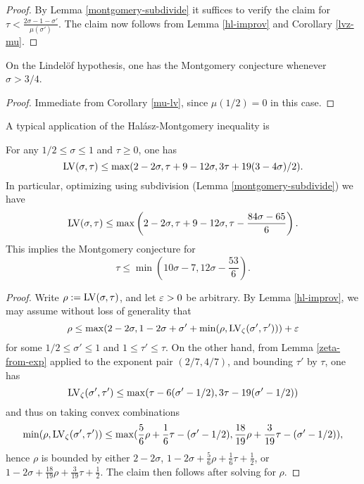 \begin{proof} By Lemma \ref{montgomery-subdivide} it suffices to verify the claim for $\tau < \frac{2\sigma-1-\sigma'}{\mu(\sigma')}$.  The claim now follows from Lemma \ref{hl-improv} and Corollary \ref{lvz-mu}.
\end{proof}

\begin{theorem}\label{htlv}\cite[Theorem 1]{halasz_distribution_1969} On the Lindel\"of hypothesis, one has the Montgomery conjecture whenever $\sigma > 3/4$.
\end{theorem}

\begin{proof}  Immediate from Corollary \ref{mu-lv}, since $\mu(1/2)=0$ in this case.
\end{proof}

A typical application of the Hal\'asz-Montgomery inequality is

\begin{lemma}\label{ivic-lvt}\cite[(11.40)]{ivic}  For any $1/2 \leq \sigma \leq 1$ and $\tau \geq 0$, one has
    $$ \mathrm{LV}(\sigma,\tau) \leq \max( 2-2\sigma, \tau + 9-12\sigma, 3\tau + 19(3-4\sigma)/2).$$
In particular, optimizing using subdivision (Lemma \ref{montgomery-subdivide}) we have
$$ \mathrm{LV}(\sigma,\tau) \leq \max\left( 2-2\sigma, \tau + 9-12\sigma, \tau - \frac{84\sigma-65}{6}\right).$$
This implies the Montgomery conjecture for
$$ \tau \leq \min( 10\sigma-7, 12 \sigma - \frac{53}{6}).$$
\end{lemma}

\begin{proof}  Write $\rho := \mathrm{LV}(\sigma,\tau)$, and let $\varepsilon>0$ be arbitrary. By Lemma \ref{hl-improv}, we may assume without loss of generality that
$$ \rho \leq \max( 2-2\sigma, 1-2\sigma + \sigma' + \min( \rho, \mathrm{LV}_\zeta(\sigma',\tau')) ) + \varepsilon$$
for some $1/2 \leq \sigma' \leq 1$ and $1 \leq \tau' \leq \tau$.  On the other hand, from Lemma \ref{zeta-from-exp} applied to the exponent pair $(2/7,4/7)$, and bounding $\tau'$ by $\tau$, one has
$$ \mathrm{LV}_\zeta(\sigma',\tau') \leq \max( \tau-6(\sigma'-1/2), 3\tau - 19(\sigma'-1/2))$$
and thus on taking convex combinations
$$ \min(\rho,\mathrm{LV}_\zeta(\sigma',\tau')) \leq \max( \frac{5}{6}\rho + \frac{1}{6} \tau - (\sigma'-1/2), \frac{18}{19} \rho + \frac{3}{19} \tau - (\sigma'-1/2) ),$$
hence $\rho$ is bounded by either $2 - 2 \sigma$, $1 - 2\sigma + \frac{5}{6}\rho + \frac{1}{6} \tau + \frac{1}{2}$, or $1-2\sigma + \frac{18}{19} \rho + \frac{3}{19} \tau + \frac{1}{2}$.  The claim then follows after solving for $\rho$.
\end{proof}
